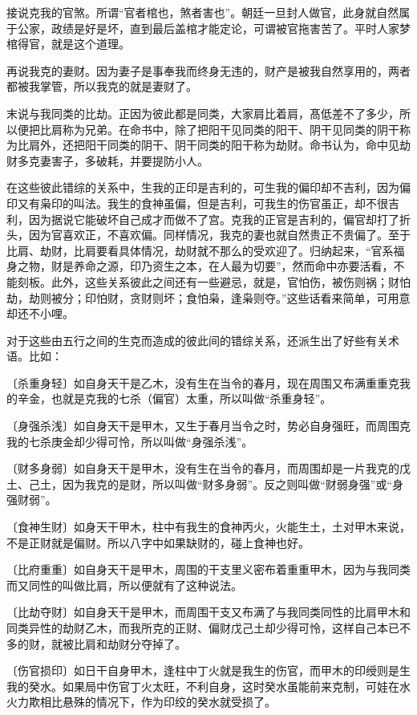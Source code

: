 \documentclass[a5paper,oneside,12pt]{ctexbook}
\begin{document}
接说克我的官煞。所谓“官者棺也，煞者害也”。朝廷一旦封人做官，此身就自然属于公家，政绩是好是坏，直到最后盖棺才能定论，可谓被官拖害苦了。平时人家梦棺得官，就是这个道理。

再说我克的妻财。因为妻子是事奉我而终身无违的，财产是被我自然享用的，两者都被我掌管，所以我克的就是妻财了。

末说与我同类的比劫。正因为彼此都是同类，大家肩比着肩，髙低差不了多少，所以便把比肩称为兄弟。在命书中，除了把阳干见同类的阳干、阴干见同类的阴干称为比肩外，还把阳干同类的阴干、阴干同类的阳干称为劫财。命书认为，命中见劫财多克妻害子，多破耗，并要提防小人。

在这些彼此错综的关系中，生我的正印是吉利的，可生我的偏印却不吉利，因为偏印又有枭印的叫法。我生的食神虽偏，但是吉利，可我生的伤官虽正，却不很吉利，因为据说它能破坏自己成才而做不了宫。克我的正官是吉利的，偏官却打了折头，因为官喜欢正，不喜欢偏。同样情况，我克的妻也就自然贵正不贵偏了。至于比肩、劫财，比肩要看具体情况，劫财就不那么的受欢迎了。归纳起来，“官系福身之物，财是养命之源，印乃资生之本，在人最为切要”，然而命中亦要活看，不能刻板。此外，这些关系彼此之间还有一些避忌，就是，官怕伤，被伤则祸；财怕劫，劫则被分；印怕财，贪财则坏；食怕枭，逢枭则夺。”这些话看来简单，可用意却还不小哩。

对于这些由五行之间的生克而造成的彼此间的错综关系，还派生出了好些有关术语。比如：

〔杀重身轻〕如自身天干是乙木，没有生在当令的春月，现在周围又布满重重克我的辛金，也就是克我的七杀（偏官）太重，所以叫做“杀重身轻”。

〔身强杀浅〕如自身天干是甲木，又生于春月当令之时，势必自身强旺，而周围克我的七杀庚金却少得可怜，所以叫做“身强杀浅”。

〔财多身弱〕如自身天干是甲木，没有生在当令的春月，而周围却是一片我克的戊土、己土，因为我克的是财，所以叫做“财多身弱”。反之则叫做“财弱身强”或“身强财弱”。

〔食神生财〕如身天干甲木，柱中有我生的食神丙火，火能生土，土对甲木来说，不是正财就是偏财。所以八字中如果缺财的，碰上食神也好。

〔比府重重〕如自身天干是甲木，周围的干支里义密布着重重甲木，因为与我同类而又同性的叫做比肩，所以便就有了这种说法。

〔比劫夺财〕如自身天干是甲木，而周围干支又布满了与我同类同性的比肩甲木和同类异性的劫财乙木，而我所克的正财、偏财戊己土却少得可怜，这样自己本已不多的财，就被比肩和劫财分夺掉了。

〔伤官损印〕如日干自身甲木，逢柱中丁火就是我生的伤官，而甲木的印绶则是生我的癸水。如果局中伤官丁火太旺，不利自身，这时癸水虽能前来克制，可娃在水火力欺相比悬殊的情况下，作为印绞的癸水就受损了。
\end{document}
